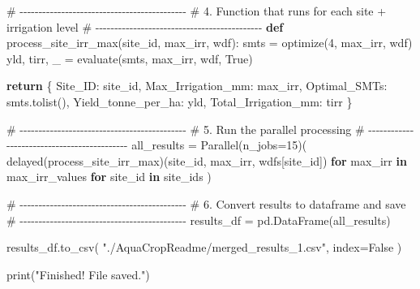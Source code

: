 \documentclass[
  letterpaper,
  DIV=11,
  numbers=noendperiod]{scrartcl}
\newenvironment{Shaded}{\begin{snugshade}}{\end{snugshade}}
\newcommand{\BuiltInTok}[1]{\textcolor[rgb]{0.00,0.23,0.31}{#1}}
\newcommand{\CommentTok}[1]{\textcolor[rgb]{0.37,0.37,0.37}{#1}}
\newcommand{\ControlFlowTok}[1]{\textcolor[rgb]{0.00,0.23,0.31}{\textbf{#1}}}
\newcommand{\DecValTok}[1]{\textcolor[rgb]{0.68,0.00,0.00}{#1}}
\newcommand{\KeywordTok}[1]{\textcolor[rgb]{0.00,0.23,0.31}{\textbf{#1}}}
\newcommand{\NormalTok}[1]{\textcolor[rgb]{0.00,0.23,0.31}{#1}}
\newcommand{\OperatorTok}[1]{\textcolor[rgb]{0.37,0.37,0.37}{#1}}
\newcommand{\StringTok}[1]{\textcolor[rgb]{0.13,0.47,0.30}{#1}}
\newcommand{\VariableTok}[1]{\textcolor[rgb]{0.07,0.07,0.07}{#1}}
\begin{document}
\begin{Shaded}
\begin{Highlighting}[]
\CommentTok{\# {-}{-}{-}{-}{-}{-}{-}{-}{-}{-}{-}{-}{-}{-}{-}{-}{-}{-}{-}{-}{-}{-}{-}{-}{-}{-}{-}{-}{-}{-}{-}{-}{-}{-}{-}{-}{-}{-}{-}{-}{-}{-}{-}{-}}
\CommentTok{\# 4. Function that runs for each site + irrigation level}
\CommentTok{\# {-}{-}{-}{-}{-}{-}{-}{-}{-}{-}{-}{-}{-}{-}{-}{-}{-}{-}{-}{-}{-}{-}{-}{-}{-}{-}{-}{-}{-}{-}{-}{-}{-}{-}{-}{-}{-}{-}{-}{-}{-}{-}{-}{-}}
\KeywordTok{def}\NormalTok{ process\_site\_irr\_max(site\_id, max\_irr, wdf):}
\NormalTok{    smts }\OperatorTok{=}\NormalTok{ optimize(}\DecValTok{4}\NormalTok{, max\_irr, wdf)  }
\NormalTok{    yld, tirr, \_ }\OperatorTok{=}\NormalTok{ evaluate(smts, max\_irr, wdf, }\VariableTok{True}\NormalTok{)}

    \ControlFlowTok{return}\NormalTok{ \{}
        \StringTok{\textquotesingle{}Site\_ID\textquotesingle{}}\NormalTok{: site\_id,}
        \StringTok{\textquotesingle{}Max\_Irrigation\_mm\textquotesingle{}}\NormalTok{: max\_irr,}
        \StringTok{\textquotesingle{}Optimal\_SMTs\textquotesingle{}}\NormalTok{: smts.tolist(),}
        \StringTok{\textquotesingle{}Yield\_tonne\_per\_ha\textquotesingle{}}\NormalTok{: yld,}
        \StringTok{\textquotesingle{}Total\_Irrigation\_mm\textquotesingle{}}\NormalTok{: tirr}
\NormalTok{    \}}

\CommentTok{\# {-}{-}{-}{-}{-}{-}{-}{-}{-}{-}{-}{-}{-}{-}{-}{-}{-}{-}{-}{-}{-}{-}{-}{-}{-}{-}{-}{-}{-}{-}{-}{-}{-}{-}{-}{-}{-}{-}{-}{-}{-}{-}{-}{-}}
\CommentTok{\# 5. Run the parallel processing}
\CommentTok{\# {-}{-}{-}{-}{-}{-}{-}{-}{-}{-}{-}{-}{-}{-}{-}{-}{-}{-}{-}{-}{-}{-}{-}{-}{-}{-}{-}{-}{-}{-}{-}{-}{-}{-}{-}{-}{-}{-}{-}{-}{-}{-}{-}{-}}
\NormalTok{all\_results }\OperatorTok{=}\NormalTok{ Parallel(n\_jobs}\OperatorTok{=}\DecValTok{15}\NormalTok{)(}
\NormalTok{    delayed(process\_site\_irr\_max)(site\_id, max\_irr, wdfs[site\_id])}
    \ControlFlowTok{for}\NormalTok{ max\_irr }\KeywordTok{in}\NormalTok{ max\_irr\_values}
    \ControlFlowTok{for}\NormalTok{ site\_id }\KeywordTok{in}\NormalTok{ site\_ids}
\NormalTok{)}

\CommentTok{\# {-}{-}{-}{-}{-}{-}{-}{-}{-}{-}{-}{-}{-}{-}{-}{-}{-}{-}{-}{-}{-}{-}{-}{-}{-}{-}{-}{-}{-}{-}{-}{-}{-}{-}{-}{-}{-}{-}{-}{-}{-}{-}{-}{-}}
\CommentTok{\# 6. Convert results to dataframe and save}
\CommentTok{\# {-}{-}{-}{-}{-}{-}{-}{-}{-}{-}{-}{-}{-}{-}{-}{-}{-}{-}{-}{-}{-}{-}{-}{-}{-}{-}{-}{-}{-}{-}{-}{-}{-}{-}{-}{-}{-}{-}{-}{-}{-}{-}{-}{-}}
\NormalTok{results\_df }\OperatorTok{=}\NormalTok{ pd.DataFrame(all\_results)}

\NormalTok{results\_df.to\_csv(}
    \StringTok{"./AquaCropReadme/merged\_results\_1.csv"}\NormalTok{,}
\NormalTok{    index}\OperatorTok{=}\VariableTok{False}
\NormalTok{)}

\BuiltInTok{print}\NormalTok{(}\StringTok{"Finished! File saved."}\NormalTok{)}
\end{Highlighting}
\end{Shaded}
\end{document}
